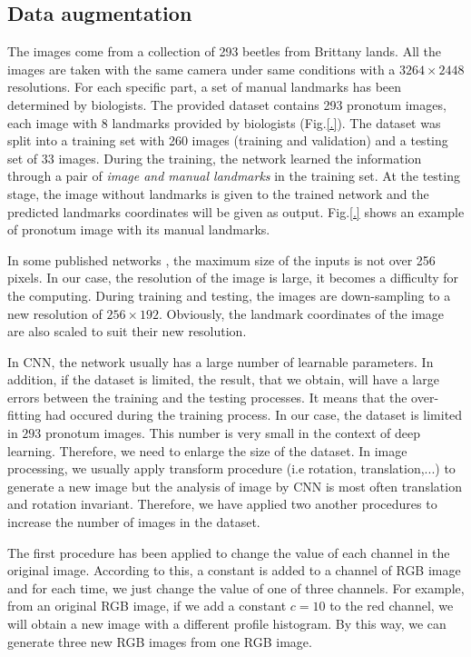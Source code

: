 \documentclass{article} %
\begin{document}
\begin{multicols}{2}
\subsection{Data augmentation}
The images come from a collection of 293 beetles from Brittany lands. All the images are taken with the same camera under same conditions with a $3264 \times 2448$ resolutions. For each specific part, a set of manual landmarks has been determined by biologists. The provided dataset contains 293 pronotum images, each image with 8 landmarks provided by biologists (Fig.\ref{.}). The dataset was split into a training set with 260 images (training and validation) and a testing set of 33 images. During the training, the network learned the information through a pair of \textit{image and manual landmarks} in the training set. At the testing stage, the image without landmarks is given to the trained network and the predicted landmarks coordinates will be given as output. Fig.\ref{.} shows an example of pronotum image with its manual landmarks.

In some published networks \cite{krizhevsky2012imagenet}\cite{sun2013deep}\cite{cintas2016automatic}, the maximum size of the inputs is not over 256 pixels. In our case, the resolution of the image is large, it becomes a difficulty for the computing. During training and testing, the images are down-sampling to a new resolution of $256 \times 192$. Obviously, the landmark coordinates of the image are also scaled to suit their new resolution. 

In CNN, the network usually has a large number of learnable parameters. In addition, if the dataset is limited, the result, that we obtain, will have a large errors between the training and the testing processes. It means that the over-fitting had occured during the training process. In our case, the dataset is limited in $293$ pronotum images. This number is very small in the context of deep learning. Therefore, we need to enlarge the size of the dataset. In image processing, we usually apply transform procedure (i.e rotation, translation,...) to generate a new image but the analysis of image by CNN is most often translation and rotation invariant. Therefore, we have applied two another procedures to increase the number of images in the dataset.

The first procedure has been applied to change the value of each channel in the original image. According to this, a constant is added to a channel of RGB image and for each time, we just change the value of one of three channels. For example, from an original RGB image, if we add a constant $c = 10$ to the red channel, we will obtain a new image with a different profile histogram. By this way, we can generate three new RGB images from one RGB image.


\end{multicols}
\end{document}
